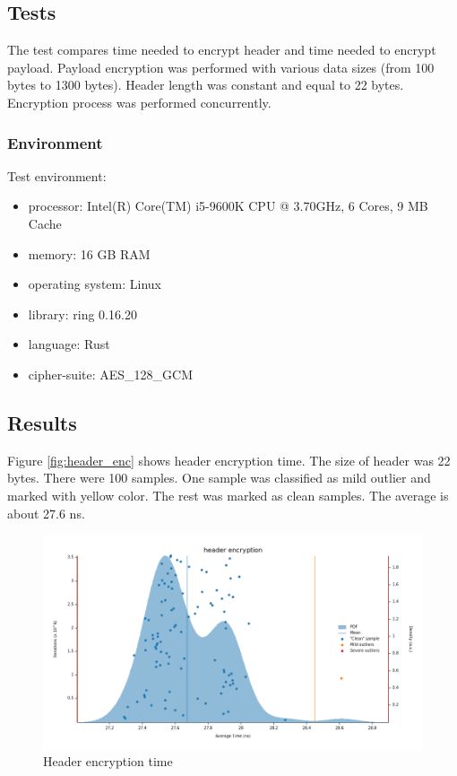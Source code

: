 \subsection{Tests}
The test compares time needed to encrypt header and time needed to encrypt payload.
Payload encryption was performed with various data sizes (from 100 bytes to 1300 bytes).
Header length was constant and equal to 22 bytes. 
Encryption process was performed concurrently. 

\subsubsection{Environment}
Test environment:
\begin{itemize}
    \item processor: Intel(R) Core(TM) i5-9600K CPU @ 3.70GHz, 6 Cores, 9 MB Cache 
    \item memory: 16 GB RAM
    \item operating system: Linux 
    \item library: ring 0.16.20
    \item language: Rust
    \item cipher-suite: AES\_128\_GCM
\end{itemize}

\subsection{Results}

Figure \ref{fig:header_enc} shows header encryption time. 
The size of header was 22 bytes.
There were 100 samples. 
One sample was classified as mild outlier and marked with yellow color.
The rest was marked as clean samples.
The average is about 27.6 ns. 

\begin{figure}[h]
    \centering
    \includegraphics[width=\textwidth]{img/header_enc_result.png}
    \caption{Header encryption time}
    \label{fig:header_enc_result}
\end{figure}

